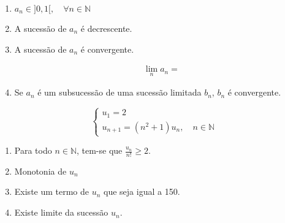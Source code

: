 \documentclass[11pt, a4paper]{article}
\begin{document}
\begin{enumerate}[label=\arabic{section}.\arabic*.]
	\item
		\begin{proposition}
			$a_n \in ]0, 1[, \quad \forall n \in \mathbb{N}$
		\end{proposition}
	\item
		\begin{proposition}
			A sucessão de $a_n$ é decrescente.
		\end{proposition}
	\item
		\begin{proposition}
			A sucessão de $a_n$ é convergente.
		\end{proposition}
		\begin{align*}
			\lim_{n} a_n =
		\end{align*}
	\item
		\begin{proposition}
			Se $a_n$ é um subsucessão de uma sucessão limitada $b_n$, $b_n$ é
			convergente.
		\end{proposition}
\end{enumerate}


\begin{equation}
	\begin{cases}
		u_1 = 2\\
		u_{n + 1} = (n^2 + 1)u_n, \quad n \in \mathbb{N}
	\end{cases}
\end{equation}

\begin{enumerate}[label=\arabic{section}.\arabic*.]
	\item
		\begin{proposition}
			Para todo $n \in \mathbb{N}$, tem-se que $\frac{u_n}{n!}\geq 2$.
		\end{proposition}
	\item Monotonia de $u_n$
	\item
		\begin{proposition}
			Existe um termo de $u_n$ que seja igual a 150.
		\end{proposition}
	\item
		\begin{proposition}
			Existe limite da sucessão $u_n$.
		\end{proposition}
\end{enumerate}

\clearpage

\end{document}
